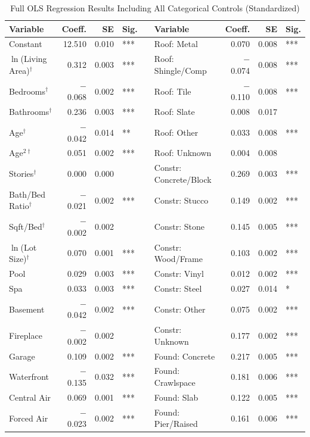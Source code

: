 \begin{landscape}
\begin{table}[H]
\centering
\caption{Full OLS Regression Results Including All Categorical Controls (Standardized)}
\label{tab:ols_full}
\begin{threeparttable}
\scriptsize
\renewcommand{\arraystretch}{0.9}
\begin{tabular}{lrrlclrrl}
\toprule
Variable & Coeff. & SE & Sig. & & Variable & Coeff. & SE & Sig. \\
\midrule
Constant & 12.510 & 0.010 & *** & & Roof: Metal & 0.070 & 0.008 & *** \\
$\ln$(Living Area)$^\dagger$ & 0.312 & 0.003 & *** & & Roof: Shingle/Comp & $-$0.074 & 0.008 & *** \\
Bedrooms$^\dagger$ & $-$0.068 & 0.002 & *** & & Roof: Tile & $-$0.110 & 0.008 & *** \\
Bathrooms$^\dagger$ & 0.236 & 0.003 & *** & & Roof: Slate & 0.008 & 0.017 & \\
Age$^\dagger$ & $-$0.042 & 0.014 & ** & & Roof: Other & 0.033 & 0.008 & *** \\
Age$^{2\dagger}$ & 0.051 & 0.002 & *** & & Roof: Unknown & 0.004 & 0.008 & \\
Stories$^\dagger$ & 0.000 & 0.000 & & & Constr: Concrete/Block & 0.269 & 0.003 & *** \\
Bath/Bed Ratio$^\dagger$ & $-$0.021 & 0.002 & *** & & Constr: Stucco & 0.149 & 0.002 & *** \\
Sqft/Bed$^\dagger$ & $-$0.002 & 0.002 & & & Constr: Stone & 0.145 & 0.005 & *** \\
$\ln$(Lot Size)$^\dagger$ & 0.070 & 0.001 & *** & & Constr: Wood/Frame & 0.103 & 0.002 & *** \\
Pool & 0.029 & 0.003 & *** & & Constr: Vinyl & 0.012 & 0.002 & *** \\
Spa & 0.033 & 0.003 & *** & & Constr: Steel & 0.027 & 0.014 & * \\
Basement & $-$0.042 & 0.002 & *** & & Constr: Other & 0.075 & 0.002 & *** \\
Fireplace & $-$0.002 & 0.002 & & & Constr: Unknown & 0.177 & 0.002 & *** \\
Garage & 0.109 & 0.002 & *** & & Found: Concrete & 0.217 & 0.005 & *** \\
Waterfront & $-$0.135 & 0.032 & *** & & Found: Crawlspace & 0.181 & 0.006 & *** \\
Central Air & 0.069 & 0.001 & *** & & Found: Slab & 0.122 & 0.005 & *** \\
Forced Air & $-$0.023 & 0.002 & *** & & Found: Pier/Raised & 0.161 & 0.006 & *** \\

\end{tabular}
\end{threeparttable}
\end{table}
\end{landscape}
